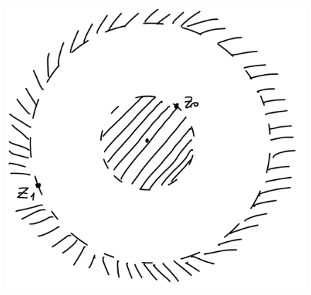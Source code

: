 \documentclass[a4paper,12pt]{article} %
\begin{document}
\begin{figure}[h!]
\centering
\includegraphics[scale = 0.1]{Que_11_pic_1.jpeg}
\end{figure}
\end{document}
